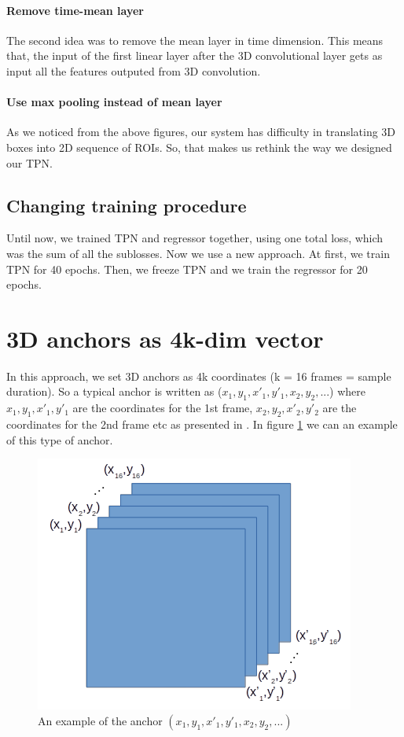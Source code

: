 \documentclass{report}
\begin{document}
\paragraph{Remove time-mean layer}
The second idea was to remove the mean layer in time dimension. This means that, the input of the first linear layer after the 3D convolutional layer gets as
input all the features outputed from 3D convolution. 
\paragraph{Use max pooling instead of mean layer}


\par
As we noticed from the above figures, our system has difficulty in translating 3D boxes into 2D sequence of ROIs. So, that makes us rethink the way we designed
our TPN.
\subsection{Changing training procedure}
Until now, we trained TPN and regressor together, using one total loss, which was the sum of all the sublosses. Now we use a new approach.
At first, we  train TPN for 40 epochs. Then, we freeze TPN and we train the regressor for 20 epochs.


\section{ 3D anchors as 4k-dim vector}
In this approach, we set 3D anchors as 4k coordinates (k = 16 frames = sample duration). So a typical anchor is written as ($x_1, y_1, x'_1, y'_1, x_2, y_2, ...$)
where $x_1, y_1, x'_1, y'_1 $ are the coordinates for the 1st frame, $x_2, y_2, x'_2, y'_2$ are the coordinates for the 2nd frame etc as presented in \cite{DBLP:journals/corr/abs-1712-09184}.
In figure \ref{fig:anchor_4k} we can an example of this type of anchor.

\begin{figure}[h]
  \centering
  \includegraphics[scale=0.5]{anchor_4k}
  \caption{An example of the anchor $(x_1,y_1,x'_1,y'_1,x_2,y_2, ...)$}
  \label{fig:anchor_4k}
\end{figure}
\end{document}
